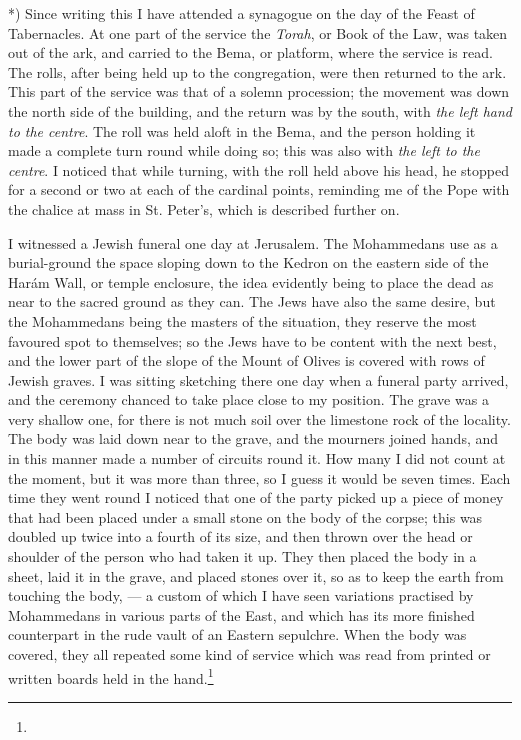 \documentclass[a4paper, 11pt, oneside, polutonikogreek, english]{article}
\begin{document}
*) Since writing this I have attended a synagogue on the day of the Feast of Tabernacles. At one part of the service the \emph{Torah}, or Book of the Law, was taken out of the ark, and carried to the Bema, or platform, where the service is read. The rolls, after being held up to the congregation, were then returned to the ark. This part of the service was that of a solemn procession; the movement was down the north side of the building, and the return was by the south, with \emph{the left hand to the centre}. The roll was held aloft in the Bema, and the person holding it made a complete turn round while doing so; this was also with \emph{the left to the centre}. I noticed that while turning, with the roll held above his head, he stopped for a second or two at each of the cardinal points, reminding me of the Pope with the chalice at mass in St. Peter's, which is described further on.

I witnessed a Jewish funeral one day at Jerusalem. The Mohammedans use as a burial-ground the space sloping down to the Kedron on the eastern side of the Harám Wall, or temple enclosure, the idea evidently being to place the dead as near to the sacred ground as they can. The Jews have also the same desire, but the Mohammedans being the masters of the situation, they reserve the most favoured spot to themselves; so the Jews have to be content with the next best, and the lower part of the slope of the Mount of Olives is covered with rows of Jewish graves. I was sitting sketching there one day when a funeral party arrived, and the ceremony chanced to take place close to my position. The grave was a very shallow one, for there is not much soil over the limestone rock of the locality. The body was laid down near to the grave, and the mourners joined hands, and in this manner made a number of circuits round it. How many I did not count at the moment, but it was more than three, so I guess it would be seven times. Each time they went round I noticed that one of the party picked up a piece of money that had been placed under a small stone on the body of the corpse; this was doubled up twice into a fourth of its size, and then thrown over the head or shoulder of the person who had taken it up. They then placed the body in a sheet, laid it in the grave, and placed stones over it, so as to keep the earth from touching the body, --- a custom of which I have seen variations practised by Mohammedans in various parts of the East, and which has its more finished counterpart in the rude vault of an Eastern sepulchre. When the body was covered, they all repeated some kind of service which was read from printed or written boards held in the hand.\footnote{}
\end{document}
